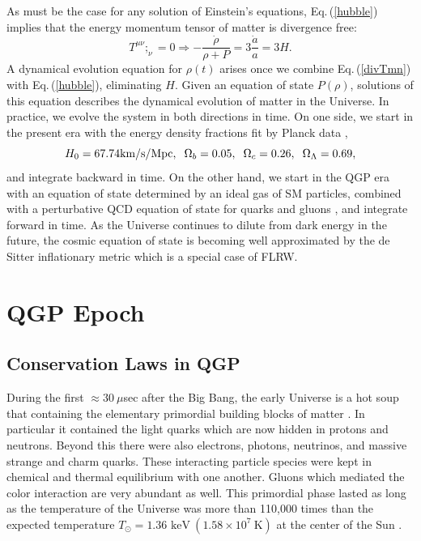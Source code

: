\documentclass[universe,article,submit,moreauthors,pdftex,a4paper]{Definitions/mdpi}
\newcommand{\keV}{\text{ keV}}
\newcommand{\beqn}{\begin{equation}}
\newcommand{\eeqn}{\end{equation}}
\newcommand{\req}[1]{Eq.\,(\ref{#1})}
\begin{document}
As must be the case for any solution of Einstein's equations,   \req{hubble} implies that the energy momentum tensor of matter is divergence free:
\beqn\label{divTmn}
T^{\mu\nu};_\nu =0 \Rightarrow -\frac{\dot\rho}{\rho+P}=3\frac{\dot a}{a}=3H.
\eeqn
A dynamical evolution equation for $\rho(t)$ arises once we combine \req{divTmn} with \req{hubble},  eliminating $H$.   Given an equation of state $P(\rho)$, solutions of this equation describes the dynamical evolution of matter in the Universe. In practice, we evolve the system in both directions in time.  On one side, we start in the present era with the energy density fractions fit by Planck data \cite{Planck:2013pxb},
\begin{equation}\label{Planck_params}
H_0=67.74\text{km/s/Mpc},\hspace{2mm} \Omega_b=0.05,\hspace{2mm} \Omega_c=0.26, \hspace{2mm}\Omega_\Lambda=0.69,
\end{equation}
 and integrate backward in time.  On the other hand, we start in the QGP era with an equation of state determined by an ideal gas of SM particles, combined with a perturbative QCD equation of state for quarks and gluons \cite{Borsanyi:2013bia}, and integrate forward in time. As the Universe continues to dilute from dark energy in the future, the cosmic equation of state is becoming well approximated by the de Sitter inflationary metric which is a special case of FLRW.



\section{QGP Epoch}\label{sec:QGP}
\subsection{Conservation Laws in QGP}\label{sec:Conservation}
\noindent During the first $\approx30\ \mu$sec after the Big Bang, the early Universe is a hot soup that containing the elementary primordial building blocks of matter \cite{Rafelski:2015cxa}. In particular it contained the light quarks which are now hidden in protons and neutrons. Beyond this there were also electrons, photons, neutrinos, and massive strange and charm quarks. These interacting particle species were kept in chemical and thermal equilibrium with one another. Gluons which mediated the color interaction are very abundant as well. This primordial phase lasted as long as the temperature of the Universe was more than 110,000 times than the expected temperature $T_{\odot}=1.36\keV\ (1.58\times10^{7}\ \mathrm{K})$ at the center of the Sun \cite{Castellani:1996cm}.
\end{document}
